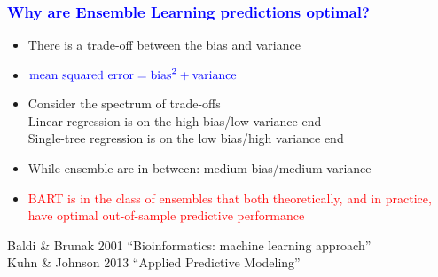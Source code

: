 \documentclass[11pt,dvipsnames,usenames,times]{beamer}
\begin{document}
\begin{frame}
\frametitle{\bf\textcolor{blue}{Why are Ensemble Learning predictions optimal?}}
\boldmath

\begin{itemize}
\item There is a trade-off between the bias and variance
\vspace*{0.1in}
\item $\textcolor{blue}{\mbox{mean squared error}= \mbox{bias}^2 + \mbox{variance}}$
\vspace*{0.1in}
\item Consider the spectrum of trade-offs\\
\vspace*{0.1in}
Linear regression is on the high bias/low variance end\\
\vspace*{0.1in}
Single-tree regression is on the low bias/high variance end\\
\vspace*{0.1in}
\item While ensemble are in between:
medium bias/medium variance
\vspace*{0.1in}
\item \textcolor{red}{BART is in the class of ensembles that
    both theoretically, and in practice, have optimal
out-of-sample predictive performance}
\end{itemize}
Baldi \& Brunak 2001 ``Bioinformatics: machine learning approach''\\
Kuhn \& Johnson 2013 ``Applied Predictive Modeling''
\end{frame}
\end{document}
